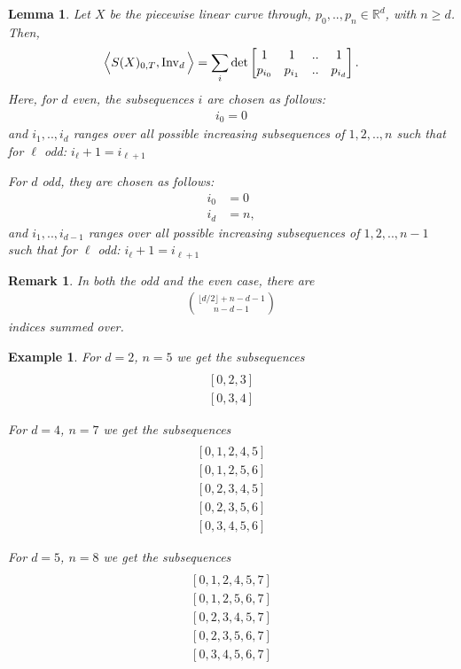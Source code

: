 \documentclass{scrartcl}
\theoremstyle{plain}
\newtheorem{example}[theorem]{Example}
\newtheorem{lemma}[theorem]{Lemma}
\newtheorem{remark}[theorem]{Remark}
\theoremstyle{definition}
\newcommand{\R}{\mathbb{R}}
\newcommand{\1}[1]{1_{\{#1\}}}
\newcommand{\ds}{d} %
\begin{document}
\begin{lemma}
  \label{lem:generalPiecewiseLinearCurve}
  Let $X$ be the piecewise linear curve through,
  $p_0,..,p_n \in \R^\ds$, with $n \ge \ds$.
  Then,
  \begin{align}
    \label{eq:invDet}
    \Big\langle S(X)_{0,T}, \firstInvariant\ds \Big\rangle
    =
    \sum_i
     \det\left[
       \begin{matrix}
         1 & 1 & .. & 1 \\
         p_{i_0} & p_{i_1} & .. & p_{i_{\ds}}
       \end{matrix}
     \right].
  \end{align}
  Here, for $\ds$ even, the subsequences $i$ are chosen as follows:
  \begin{align*}
    i_0 = 0
  \end{align*}
  and $i_1,..,i_{\ds}$ ranges over all possible increasing
  subsequences of $1,2,..,n$ such that
  for $\ell$ odd: $i_\ell + 1 = i_{\ell+1}$

  For $\ds$ odd, they are chosen as follows:
  \begin{align*}
    i_0 &= 0 \\
    i_{\ds} &= n,
  \end{align*}
  and $i_1,..,i_{\ds-1}$ ranges over all possible increasing
  subsequences of $1,2,..,n-1$ such that
  for $\ell$ odd: $i_\ell + 1 = i_{\ell+1}$
\end{lemma}
\begin{remark}
  In both the odd and the even case,
  there are
  \begin{align*}
    \binom{\lfloor d/2 \rfloor + n - \ds - 1 }{ n - d -1 }
  \end{align*}
  indices summed over.
\end{remark}
\begin{example}
  For $\ds=2$, $n=5$ we get the subsequences
  \begin{align*}
  [0, 1, 2] \\
  [0, 2, 3] \\
  [0, 3, 4]
  \end{align*}

  For $\ds=4$, $n=7$ we get the subsequences
  \begin{align*}
  [0, 1, 2, 3, 4] \\
  [0, 1, 2, 4, 5] \\
  [0, 1, 2, 5, 6] \\
  [0, 2, 3, 4, 5] \\
  [0, 2, 3, 5, 6] \\
  [0, 3, 4, 5, 6]
  \end{align*}


  For $\ds=5$, $n=8$ we get the subsequences
  \begin{align*}
  [0, 1, 2, 3, 4, 7] \\
  [0, 1, 2, 4, 5, 7] \\
  [0, 1, 2, 5, 6, 7] \\
  [0, 2, 3, 4, 5, 7] \\
  [0, 2, 3, 5, 6, 7] \\
  [0, 3, 4, 5, 6, 7]
  \end{align*}
\end{example}
\end{document}
